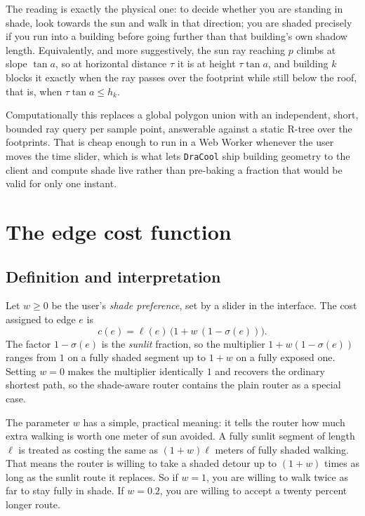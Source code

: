 \documentclass[11pt,a4paper]{article}
\theoremstyle{plain}
\theoremstyle{definition}
\theoremstyle{remark}
\begin{document}
The reading is exactly the physical one: to decide whether you are standing in shade, look towards the sun and walk in that direction; you are shaded precisely if you run into a building before going further than that building's own shadow length. Equivalently, and more suggestively, the sun ray reaching $p$ climbs at slope $\tan a$, so at horizontal distance $\tau$ it is at height $\tau \tan a$, and building $k$ blocks it exactly when the ray passes over the footprint while still below the roof, that is, when $\tau \tan a \le h_k$.

Computationally this replaces a global polygon union with an independent, short, bounded ray query per sample point, answerable against a static R-tree over the footprints. That is cheap enough to run in a Web Worker whenever the user moves the time slider, which is what lets \texttt{DraCool} ship building geometry to the client and compute shade live rather than pre-baking a fraction that would be valid for only one instant.

\section{The edge cost function}
\label{sec:cost}

\subsection{Definition and interpretation}

Let $w \ge 0$ be the user's \emph{shade preference}, set by a slider in the interface. The cost assigned to edge $e$ is
$$c(e) = \ell(e)\,\big(1 + w\,(1 - \sigma(e))\big).$$
The factor $1 - \sigma(e)$ is the \emph{sunlit} fraction, so the multiplier $1 + w(1-\sigma(e))$ ranges from $1$ on a fully shaded segment up to $1 + w$ on a fully exposed one. Setting $w = 0$ makes the multiplier identically $1$ and recovers the ordinary shortest path, so the shade-aware router contains the plain router as a special case.

The parameter $w$ has a simple, practical meaning: it tells the router how much extra walking is worth one meter of sun avoided. A fully sunlit segment of length $\ell$ is treated as costing the same as $(1+w)\ell$ meters of fully shaded walking. That means the router is willing to take a shaded detour up to $(1+w)$ times as long as the sunlit route it replaces. So if $w = 1$, you are willing to walk twice as far to stay fully in shade. If $w = 0.2$, you are willing to accept a twenty percent longer route.
\end{document}
